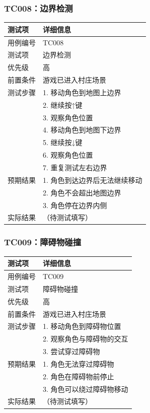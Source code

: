 \documentclass[a4paper,12pt]{article}
\begin{document}
\subsubsection{TC008：边界检测}
\begin{table}[h]
\centering
\begin{tabular}{ll}
\toprule
测试项 & 详细信息 \\
\midrule
用例编号 & TC008 \\
测试项 & 边界检测 \\
优先级 & 高 \\
前置条件 & 游戏已进入村庄场景 \\
测试步骤 & 1. 移动角色到地图上边界 \\
 & 2. 继续按↑键 \\
 & 3. 观察角色位置 \\
 & 4. 移动角色到地图下边界 \\
 & 5. 继续按↓键 \\
 & 6. 观察角色位置 \\
 & 7. 重复测试左右边界 \\
预期结果 & 1. 角色到达边界后无法继续移动 \\
 & 2. 角色不会超出地图边界 \\
 & 3. 角色停在边界内侧 \\
实际结果 & （待测试填写） \\
\bottomrule
\end{tabular}
\end{table}

\subsubsection{TC009：障碍物碰撞}
\begin{table}[h]
\centering
\begin{tabular}{ll}
\toprule
测试项 & 详细信息 \\
\midrule
用例编号 & TC009 \\
测试项 & 障碍物碰撞 \\
优先级 & 高 \\
前置条件 & 游戏已进入村庄场景 \\
测试步骤 & 1. 移动角色到障碍物位置 \\
 & 2. 观察角色与障碍物的交互 \\
 & 3. 尝试穿过障碍物 \\
预期结果 & 1. 角色无法穿过障碍物 \\
 & 2. 角色在障碍物前停止 \\
 & 3. 角色可以绕过障碍物移动 \\
实际结果 & （待测试填写） \\
\bottomrule
\end{tabular}
\end{table}
\end{document}
